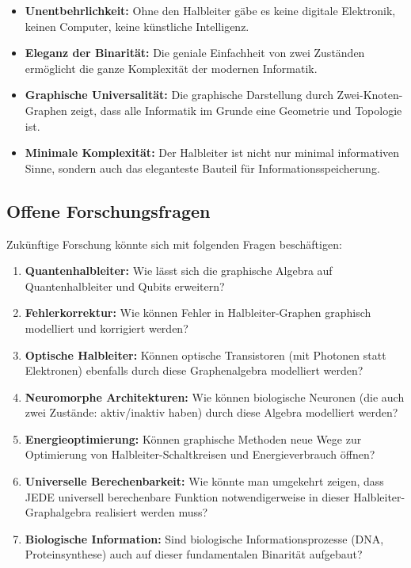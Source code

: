 \documentclass[12pt, a4paper]{article}
\theoremstyle{definition}
\theoremstyle{remark}
\begin{document}
\begin{itemize}
  \item \textbf{Unentbehrlichkeit:} Ohne den Halbleiter gäbe es keine digitale Elektronik, keinen Computer, keine künstliche Intelligenz.

  \item \textbf{Eleganz der Binarität:} Die geniale Einfachheit von zwei Zuständen ermöglicht die ganze Komplexität der modernen Informatik.

  \item \textbf{Graphische Universalität:} Die graphische Darstellung durch Zwei-Knoten-Graphen zeigt, dass alle Informatik im Grunde eine Geometrie und Topologie ist.

  \item \textbf{Minimale Komplexität:} Der Halbleiter ist nicht nur minimal informativen Sinne, sondern auch das eleganteste Bauteil für Informationsspeicherung.
\end{itemize}

\subsection{Offene Forschungsfragen}
\label{subsec:offene_fragen}

Zukünftige Forschung könnte sich mit folgenden Fragen beschäftigen:

\begin{enumerate}[label=(\alph*)]
  \item \textbf{Quantenhalbleiter:} Wie lässt sich die graphische Algebra auf Quantenhalbleiter und Qubits erweitern?

  \item \textbf{Fehlerkorrektur:} Wie können Fehler in Halbleiter-Graphen graphisch modelliert und korrigiert werden?

  \item \textbf{Optische Halbleiter:} Können optische Transistoren (mit Photonen statt Elektronen) ebenfalls durch diese Graphenalgebra modelliert werden?

  \item \textbf{Neuromorphe Architekturen:} Wie können biologische Neuronen (die auch zwei Zustände: aktiv/inaktiv haben) durch diese Algebra modelliert werden?

  \item \textbf{Energieoptimierung:} Können graphische Methoden neue Wege zur Optimierung von Halbleiter-Schaltkreisen und Energieverbrauch öffnen?

  \item \textbf{Universelle Berechenbarkeit:} Wie könnte man umgekehrt zeigen, dass JEDE universell berechenbare Funktion notwendigerweise in dieser Halbleiter-Graphalgebra realisiert werden muss?

  \item \textbf{Biologische Information:} Sind biologische Informationsprozesse (DNA, Proteinsynthese) auch auf dieser fundamentalen Binarität aufgebaut?
\end{enumerate}
\end{document}
